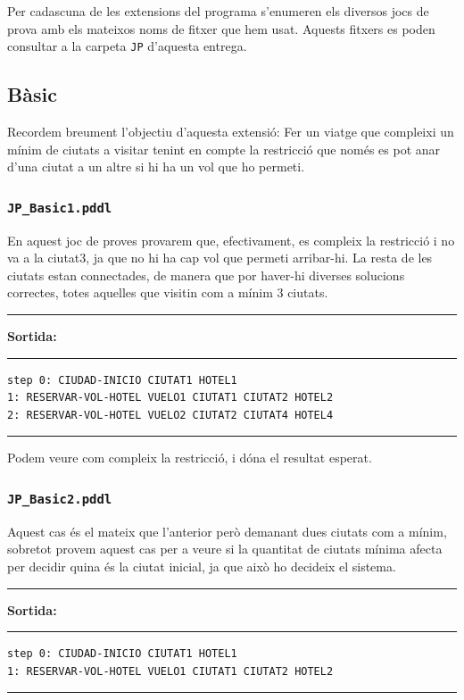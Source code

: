 \documentclass[11pt,a4paper]{article}
\begin{document}
Per cadascuna de les extensions del programa s'enumeren els diversos jocs de prova amb els mateixos noms de fitxer que hem usat. Aquests fitxers es poden consultar a la carpeta \texttt{JP} d'aquesta entrega.

\subsection{Bàsic}

Recordem breument l'objectiu d'aquesta extensió: Fer un viatge que compleixi un mínim de ciutats a visitar tenint en compte la restricció que només es pot anar d'una ciutat a un altre si hi ha un vol que ho permeti.

\subsubsection*{\texttt{JP\_Basic1.pddl}}

En aquest joc de proves provarem que, efectivament, es compleix la restricció i no va a la ciutat3, ja que no hi ha cap vol que permeti arribar-hi. La resta de les ciutats estan connectades, de manera que por haver-hi diverses solucions correctes, totes aquelles que visitin com a mínim 3 ciutats.

\begin{samepage}
\medskip
\noindent
\rule{0.1\textwidth}{0.5mm}
\textbf{Sortida:}
\rule{0.76\textwidth}{0.5mm}
\begin{verbatim}
step 0: CIUDAD-INICIO CIUTAT1 HOTEL1
1: RESERVAR-VOL-HOTEL VUELO1 CIUTAT1 CIUTAT2 HOTEL2
2: RESERVAR-VOL-HOTEL VUELO2 CIUTAT2 CIUTAT4 HOTEL4
\end{verbatim}
\rule{\textwidth}{0.5mm}
\medskip
\end{samepage}

Podem veure com compleix la restricció, i dóna el resultat esperat.

\subsubsection*{\texttt{JP\_Basic2.pddl}}

Aquest cas és el mateix que l'anterior però demanant dues ciutats com a mínim, sobretot provem aquest cas per a veure si la quantitat de ciutats mínima afecta per decidir quina és la ciutat inicial, ja que això ho decideix el sistema.

\begin{samepage}
\medskip
\noindent
\rule{0.1\textwidth}{0.5mm}
\textbf{Sortida:}
\rule{0.76\textwidth}{0.5mm}
\begin{verbatim}
step 0: CIUDAD-INICIO CIUTAT1 HOTEL1
1: RESERVAR-VOL-HOTEL VUELO1 CIUTAT1 CIUTAT2 HOTEL2
\end{verbatim}
\rule{\textwidth}{0.5mm}
\medskip
\end{samepage}
\end{document}
